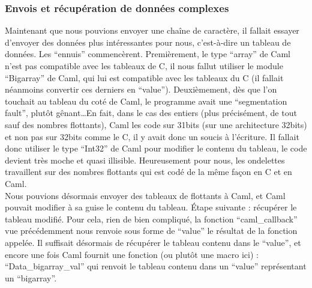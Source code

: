 \documentclass[a4paper,12pt]{article}
\begin{document}
		\subsubsection{Envois et récupération de données complexes}
Maintenant que nous pouvions envoyer une cha\^ine de caractère, il fallait essayer
d'envoyer des données plus intéressantes pour nous, c'est-à-dire un tableau de
données. Les ``ennuis'' commencèrent. Premièrement, le type ``array'' de Caml
n'est pas compatible avec les tableaux de C, il nous fallut utiliser le module
``Bigarray'' de Caml, qui lui est compatible avec les tableaux du C (il fallait
néanmoins convertir ces derniers en ``value''). Deuxièmement, dès que l'on
touchait au tableau du coté de Caml, le programme avait une ``segmentation
fault'', plutôt gênant\ldots En fait, dans le cas des entiers (plus précisément,
de tout sauf des nombres flottants), Caml les code sur 31bits (sur une
architecture 32bits) et non pas sur 32bits comme le C, il y avait donc un soucis
à l'écriture. Il fallait donc utiliser le type ``Int32'' de Caml pour modifier
le contenu du tableau, le code devient très moche et quasi illisible.
Heureusement pour nous, les ondelettes travaillent sur des nombres flottants qui
est codé de la même façon en C et en Caml.\\
Nous pouvions désormais envoyer des tableaux de flottants à Caml, et Caml
pouvait modifier à sa guise le contenu du tableau. Étape suivante : récupérer le
tableau modifié. Pour cela, rien de bien compliqué, la fonction
``caml\_callback'' vue précédemment nous renvoie sous forme de ``value'' le
résultat de la fonction appelée. Il suffisait désormais de récupérer le tableau
contenu dans le ``value'', et encore une fois Caml fournit une fonction (ou
plutôt une macro ici) : ``Data\_bigarray\_val'' qui renvoit le tableau contenu
dans un ``value'' représentant un ``bigarray''.
\end{document}

